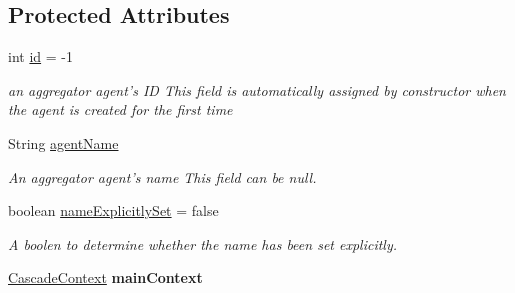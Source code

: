 \subsection*{Protected Attributes}
\begin{DoxyCompactItemize}
\item 
\hypertarget{classuk_1_1ac_1_1dmu_1_1iesd_1_1cascade_1_1agents_1_1aggregators_1_1_aggregator_agent_ac5b9fac737cda634478ba573fb7d0567}{int \hyperlink{classuk_1_1ac_1_1dmu_1_1iesd_1_1cascade_1_1agents_1_1aggregators_1_1_aggregator_agent_ac5b9fac737cda634478ba573fb7d0567}{id} = -\/1}\label{classuk_1_1ac_1_1dmu_1_1iesd_1_1cascade_1_1agents_1_1aggregators_1_1_aggregator_agent_ac5b9fac737cda634478ba573fb7d0567}

\begin{DoxyCompactList}\small\item\em an aggregator agent's I\-D This field is automatically assigned by constructor when the agent is created for the first time \end{DoxyCompactList}\item 
\hypertarget{classuk_1_1ac_1_1dmu_1_1iesd_1_1cascade_1_1agents_1_1aggregators_1_1_aggregator_agent_aafb1b7db3e07132aebc0d6e1f47a32de}{String \hyperlink{classuk_1_1ac_1_1dmu_1_1iesd_1_1cascade_1_1agents_1_1aggregators_1_1_aggregator_agent_aafb1b7db3e07132aebc0d6e1f47a32de}{agent\-Name}}\label{classuk_1_1ac_1_1dmu_1_1iesd_1_1cascade_1_1agents_1_1aggregators_1_1_aggregator_agent_aafb1b7db3e07132aebc0d6e1f47a32de}

\begin{DoxyCompactList}\small\item\em An aggregator agent's name This field can be {\ttfamily null}. \end{DoxyCompactList}\item 
boolean \hyperlink{classuk_1_1ac_1_1dmu_1_1iesd_1_1cascade_1_1agents_1_1aggregators_1_1_aggregator_agent_a4ff8e9e3fb5095e5545ada79a037ad7a}{name\-Explicitly\-Set} = false
\begin{DoxyCompactList}\small\item\em A boolen to determine whether the name has been set explicitly. \end{DoxyCompactList}\item 
\hypertarget{classuk_1_1ac_1_1dmu_1_1iesd_1_1cascade_1_1agents_1_1aggregators_1_1_aggregator_agent_aa99742ebab7cfb9dea8b97691e530128}{\hyperlink{classuk_1_1ac_1_1dmu_1_1iesd_1_1cascade_1_1context_1_1_cascade_context}{Cascade\-Context} {\bfseries main\-Context}}\label{classuk_1_1ac_1_1dmu_1_1iesd_1_1cascade_1_1agents_1_1aggregators_1_1_aggregator_agent_aa99742ebab7cfb9dea8b97691e530128}


\end{DoxyCompactItemize}
